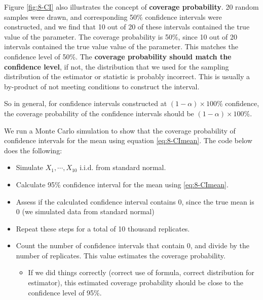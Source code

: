 \documentclass[
]{book}
\providecommand{\tightlist}{%
  \setlength{\itemsep}{0pt}\setlength{\parskip}{0pt}}
\theoremstyle{definition}
\theoremstyle{definition}
\theoremstyle{definition}
\theoremstyle{definition}
\theoremstyle{remark}
\begin{document}
Figure \ref{fig:8-CI} also illustrates the concept of \textbf{coverage probability}. 20 random samples were drawn, and corresponding 50\% confidence intervals were constructed, and we find that 10 out of 20 of these intervals contained the true value of the parameter. The coverage probability is 50\%, since 10 out of 20 intervals contained the true value value of the parameter. This matches the confidence level of 50\%. The \textbf{coverage probability should match the confidence level}, if not, the distribution that we used for the sampling distribution of the estimator or statistic is probably incorrect. This is usually a by-product of not meeting conditions to construct the interval.

So in general, for confidence intervals constructed at \((1-\alpha) \times 100\%\) confidence, the coverage probability of the confidence intervals should be \((1-\alpha) \times 100\%\).

We run a Monte Carlo simulation to show that the coverage probability of confidence intervals for the mean using equation \eqref{eq:8-CImean}. The code below does the following:

\begin{itemize}
\tightlist
\item
  Simulate \(X_1, \cdots, X_{10}\) i.i.d. from standard normal.
\item
  Calculate 95\% confidence interval for the mean using \eqref{eq:8-CImean}.
\item
  Assess if the calculated confidence interval contains 0, since the true mean is 0 (we simulated data from standard normal)
\item
  Repeat these steps for a total of 10 thousand replicates.
\item
  Count the number of confidence intervals that contain 0, and divide by the number of replicates. This value estimates the coverage probability.

  \begin{itemize}
  \tightlist
  \item
    If we did things correctly (correct use of formula, correct distribution for estimator), this estimated coverage probability should be close to the confidence level of 95\%.
  \end{itemize}
\end{itemize}
\end{document}
